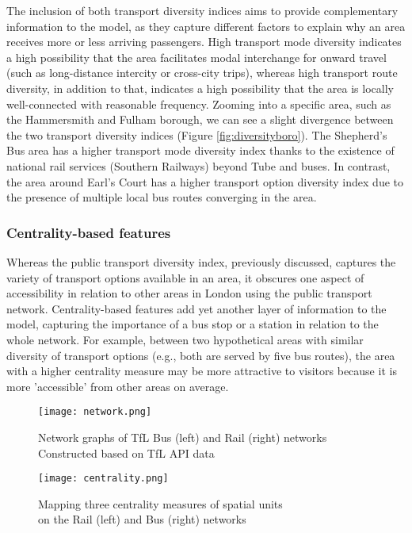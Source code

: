 The inclusion of both transport diversity indices aims to provide complementary information to the model, as they capture different factors to explain why an area receives more or less arriving passengers. High transport mode diversity indicates a high possibility that the area facilitates modal interchange for onward travel (such as long-distance intercity or cross-city trips), whereas high transport route diversity, in addition to that, indicates a high possibility that the area is locally well-connected with reasonable frequency. Zooming into a specific area, such as the Hammersmith and Fulham borough, we can see a slight divergence between the two transport diversity indices (Figure \ref{fig:diversityboro}). The Shepherd's Bus area has a higher transport mode diversity index thanks to the existence of national rail services (Southern Railways) beyond Tube and buses. In contrast, the area around Earl's Court has a higher transport option diversity index due to the presence of multiple local bus routes converging in the area.

\pagebreak[4] %
\subsubsection*{Centrality-based features}

Whereas the public transport diversity index, previously discussed, captures the variety of transport options available in an area, it obscures one aspect of accessibility in relation to other areas in London using the public transport network. Centrality-based features add yet another layer of information to the model, capturing the importance of a bus stop or a station in relation to the whole network. For example, between two hypothetical areas with similar diversity of transport options (e.g., both are served by five bus routes), the area with a higher centrality measure may be more attractive to visitors because it is more 'accessible' from other areas on average. 

\begin{figure}[hbt]
    \centering
    \texttt{[image: network.png]}
    \captionsetup{justification=centering}
    \caption{Network graphs of TfL Bus (left) and Rail (right) networks\\Constructed based on TfL API data}
    \label{fig:network}
\end{figure}

\begin{figure}[!ht]
    \centering
    \texttt{[image: centrality.png]}
    \captionsetup{justification=centering}
    \caption{Mapping three centrality measures of spatial units\\on the Rail (left) and Bus (right) networks}
    \label{fig:centrality}
\end{figure}

